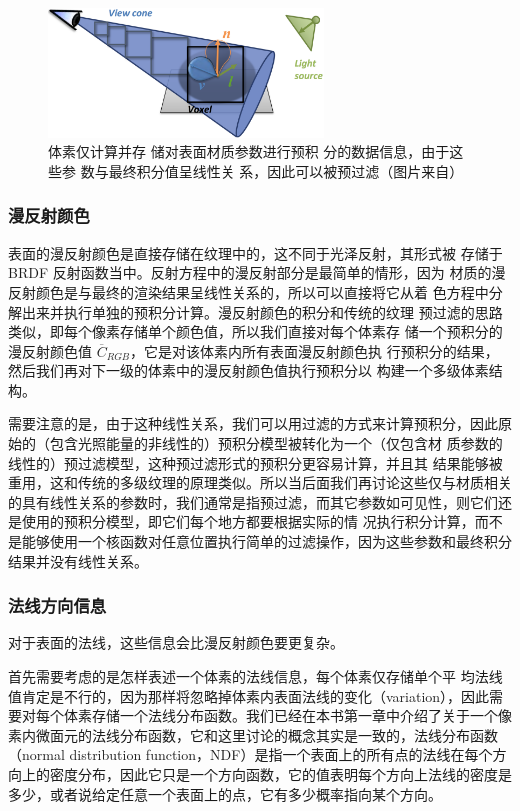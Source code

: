 \begin{figure}
\sidecaption
	\includegraphics[width=0.65\textwidth]{figures/vct/vct-9-1}
	\caption{体素仅计算并存 储对表面材质参数进行预积 分的数据信息，由于这些参 数与最终积分值呈线性关 系，因此可以被预过滤（图片来自\cite{a:InteractiveIndirectIlluminationUsingVoxelConeTracing}）}
	\label{f:vct-9-1}
\end{figure}



\subsubsection{漫反射颜色}
表面的漫反射颜色是直接存储在纹理中的，这不同于光泽反射，其形式被 存储于 BRDF 反射函数当中。反射方程中的漫反射部分是最简单的情形，因为 材质的漫反射颜色是与最终的渲染结果呈线性关系的，所以可以直接将它从着 色方程中分解出来并执行单独的预积分计算。漫反射颜色的积分和传统的纹理 预过滤的思路类似，即每个像素存储单个颜色值，所以我们直接对每个体素存 储一个预积分的漫反射颜色值 $\overline{C}_{RGB}$，它是对该体素内所有表面漫反射颜色执 行预积分的结果，然后我们再对下一级的体素中的漫反射颜色值执行预积分以 构建一个多级体素结构。

需要注意的是，由于这种线性关系，我们可以用过滤的方式来计算预积分，因此原始的（包含光照能量的非线性的）预积分模型被转化为一个（仅包含材 质参数的线性的）预过滤模型，这种预过滤形式的预积分更容易计算，并且其 结果能够被重用，这和传统的多级纹理的原理类似。所以当后面我们再讨论这些仅与材质相关的具有线性关系的参数时，我们通常是指预过滤，而其它参数如可见性，则它们还是使用的预积分模型，即它们每个地方都要根据实际的情 况执行积分计算，而不是能够使用一个核函数对任意位置执行简单的过滤操作，因为这些参数和最终积分结果并没有线性关系。



\subsubsection{法线方向信息}
对于表面的法线，这些信息会比漫反射颜色要更复杂。

首先需要考虑的是怎样表述一个体素的法线信息，每个体素仅存储单个平 均法线值肯定是不行的，因为那样将忽略掉体素内表面法线的变化（variation），因此需要对每个体素存储一个法线分布函数。我们已经在本书第一章中介绍了关于一个像素内微面元的法线分布函数，它和这里讨论的概念其实是一致的，法线分布函数（normal distribution function，NDF）是指一个表面上的所有点的法线在每个方向上的密度分布，因此它只是一个方向函数，它的值表明每个方向上法线的密度是多少，或者说给定任意一个表面上的点，它有多少概率指向某个方向。

